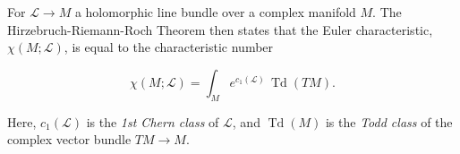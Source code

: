 \documentclass{article}
\newcommand{\ra}{\rightarrow}
\newcommand{\mcL}{\mathcal{L}}
\DeclareMathOperator{\Td}{Td}
\begin{document}
For $\mcL \ra M$ a holomorphic line bundle over a complex manifold $M$. The Hirzebruch-Riemann-Roch Theorem then states that the Euler characteristic, $\chi(M; \mcL)$, is equal to the characteristic number

\begin{equation*}
	\chi(M; \mcL) =	\int_{M} e^{c_{1}(\mcL)}\, \Td(TM).
\end{equation*}

Here, $c_{1}(\mcL)$ is the \emph{1st Chern class} of $\mcL$, and $\Td(M)$ is the \emph{Todd class} of the complex vector bundle $TM \ra M$.







  


\end{document}
